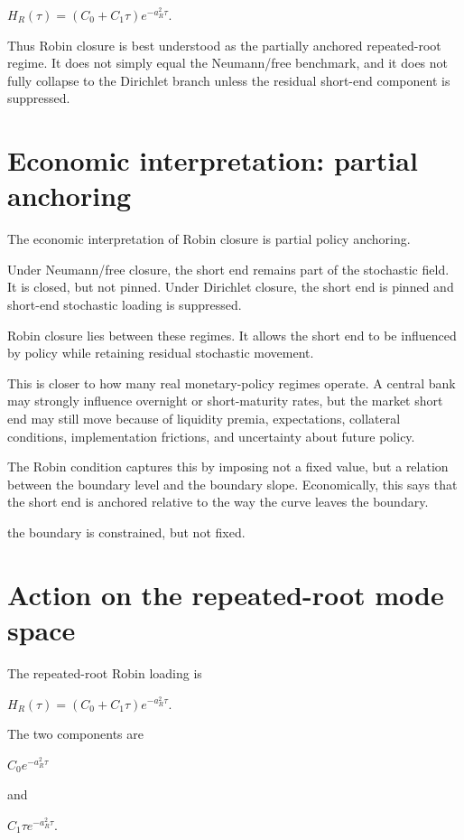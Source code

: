\documentclass[11pt,oneside]{book}
\begin{document}
$H_R(\tau)=(C_0+C_1\tau)e^{-a_R^2\tau}$.

Thus Robin closure is best understood as the partially anchored
repeated-root regime. It does not simply equal the Neumann/free
benchmark, and it does not fully collapse to the Dirichlet branch unless
the residual short-end component is suppressed.

\section{Economic interpretation: partial
anchoring}\label{economic-interpretation-partial-anchoring}

The economic interpretation of Robin closure is partial policy
anchoring.

Under Neumann/free closure, the short end remains part of the stochastic
field. It is closed, but not pinned. Under Dirichlet closure, the short
end is pinned and short-end stochastic loading is suppressed.

Robin closure lies between these regimes. It allows the short end to be
influenced by policy while retaining residual stochastic movement.

This is closer to how many real monetary-policy regimes operate. A
central bank may strongly influence overnight or short-maturity rates,
but the market short end may still move because of liquidity premia,
expectations, collateral conditions, implementation frictions, and
uncertainty about future policy.

The Robin condition captures this by imposing not a fixed value, but a
relation between the boundary level and the boundary slope.
Economically, this says that the short end is anchored relative to the
way the curve leaves the boundary.

the boundary is constrained, but not fixed.

\section{Action on the repeated-root mode
space}\label{action-on-the-repeated-root-mode-space-1}

The repeated-root Robin loading is

$H_R(\tau)=(C_0+C_1\tau)e^{-a_R^2\tau}$.

The two components are

$C_0e^{-a_R^2\tau}$

and

$C_1\tau e^{-a_R^2\tau}$.
\end{document}
